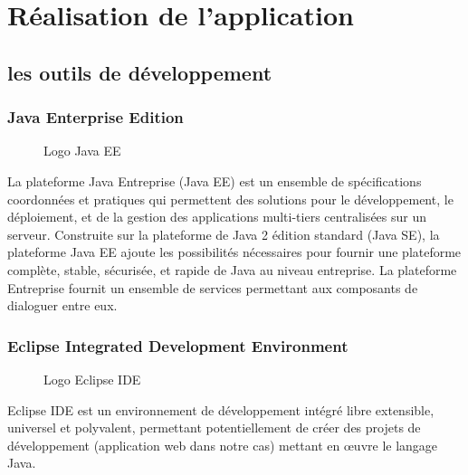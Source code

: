 \chapter{Réalisation de l'application}



\section{les outils de développement}

\subsection{Java Enterprise Edition }

\begin{figure}[H]
    \centering
    \caption{Logo Java EE}
\end{figure}
La plateforme Java Entreprise (Java EE) est un ensemble de spécifications coordonnées et pratiques qui permettent des solutions pour le développement, le déploiement, et de la gestion des applications multi-tiers centralisées sur un serveur. Construite sur la plateforme de Java 2 édition standard (Java SE), la plateforme Java EE ajoute les possibilités nécessaires pour fournir une plateforme complète, stable, sécurisée, et rapide de Java au niveau entreprise. 
La plateforme Entreprise fournit un ensemble de services permettant aux composants de dialoguer entre eux.
\subsection{Eclipse Integrated Development Environment}
\begin{figure}[H]
    \centering
    \caption{Logo Eclipse IDE}
\end{figure}
Eclipse IDE est un environnement de développement intégré libre extensible, universel et polyvalent, permettant potentiellement de créer des projets de développement (application web dans notre cas) mettant en œuvre le langage Java.

